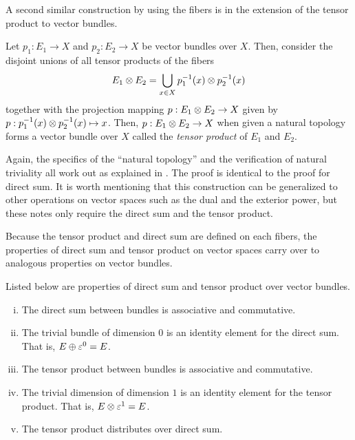 \documentclass[../sean_thesis.tex]{subfiles}
\begin{document}
A second similar construction by using the fibers is in the extension of the tensor product to vector bundles.

\begin{definition}
	Let $p_1: E_1 \to X$ and $p_2: E_2 \to X$ be vector bundles over $X$. Then, consider the disjoint unions of all tensor products of the fibers
\begin{equation*}
	E_1 \otimes E_2 = \bigcup_{x \in X} p_1^{-1}(x) \otimes p_2^{-1}(x)
\end{equation*}
together with the projection mapping $p: E_1 \otimes E_2 \to X$ given by $p: p_1^{-1}(x) \otimes p_2^{-1}(x) \mapsto x$. Then, $p: E_1 \otimes E_2 \to X$ when given a natural topology forms a vector bundle over $X$ called the \emph{tensor product} of $E_1$ and $E_2$.
\end{definition}

Again, the specifics of the ``natural topology'' and the verification of natural triviality all work out as explained in . The proof is identical to the proof for direct sum. It is worth mentioning that this construction can be generalized to other operations on vector spaces such as the dual and the exterior power, but these notes only require the direct sum and the tensor product.

Because the tensor product and direct sum are defined on each fibers, the properties of direct sum and tensor product on vector spaces carry over to analogous properties on vector bundles.

\begin{claim}
Listed below are properties of direct sum and tensor product over vector bundles.
\vspace{-\varparskip}
\begin{enumerate}[(i)]
	\item The direct sum between bundles is associative and commutative.
	\item The trivial bundle of dimension $0$ is an identity element for the direct sum. That is, $E \oplus \varepsilon^{0} = E$.
	\item The tensor product between bundles is associative and commutative.
	\item The trivial dimension of dimension $1$ is an  identity element for the tensor product. That is, $E \otimes \varepsilon^{1} = E$.
	\item The tensor product distributes over direct sum.
\end{enumerate}
\end{claim}
\end{document}
